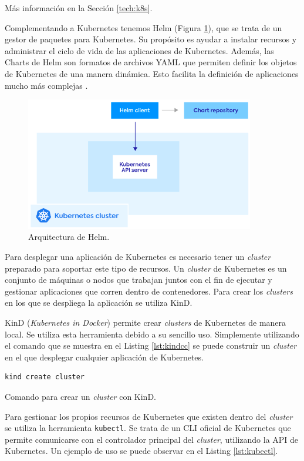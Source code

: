 Más información en la Sección \ref{tech:k8s}.

Complementando a Kubernetes tenemos Helm (Figura \ref{fig:helm}), que se trata de un gestor de paquetes para Kubernetes. Su propósito es ayudar a instalar recursos y administrar el ciclo de vida de las aplicaciones de Kubernetes. Además, las Charts de Helm son formatos de archivos YAML que permiten definir los objetos de Kubernetes de una manera dinámica. Esto facilita la definición de aplicaciones mucho más complejas .

\begin{figure}
  \centerline{\includegraphics[width=10cm]{figuras/helm}}
  \caption{Arquitectura de Helm\cite{img:helm}.}
  \label{fig:helm}
\end{figure}

Para desplegar una aplicación de Kubernetes es necesario tener un \textit{cluster} preparado para soportar este tipo de recursos. Un \textit{cluster} de Kubernetes es un conjunto de máquinas o nodos que trabajan juntos con el fin de ejecutar y gestionar aplicaciones que corren dentro de contenedores. Para crear los \textit{clusters} en los que se despliega la aplicación se utiliza KinD\cite{kind}.

KinD (\textit{Kubernetes in Docker}) permite crear \textit{clusters} de Kubernetes de manera local. Se utiliza esta herramienta debido a su sencillo uso. Simplemente utilizando el comando que se muestra en el Listing \ref{lst:kindcc} se puede construir un \textit{cluster} en el que desplegar cualquier aplicación de Kubernetes.

\begin{listing}[!ht]
  \begin{verbatim}
kind create cluster
  \end{verbatim}
  \caption{Comando para crear un \textit{cluster} con KinD.}
  \label{lst:kindcc}
\end{listing}

Para gestionar los propios recursos de Kubernetes que existen dentro del \textit{cluster} se utiliza la herramienta \texttt{kubectl}\cite{kubectl}. Se trata de un CLI oficial de Kubernetes que permite comunicarse con el controlador principal del \textit{cluster}, utilizando la API de Kubernetes. Un ejemplo de uso se puede observar en el Listing \ref{lst:kubectl}.

